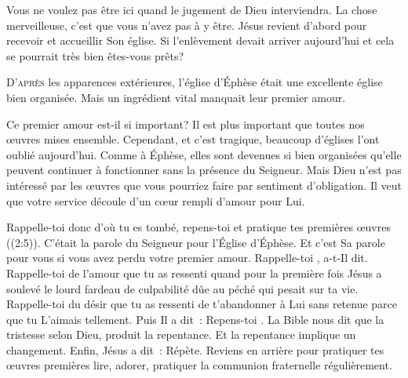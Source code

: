 Vous ne voulez pas être ici quand le jugement de Dieu interviendra.
 La chose merveilleuse, c'est que vous n'avez pas à y être.
 Jésus revient d'abord pour recevoir et accueillir Son église. 
 Si l'enlèvement devait arriver aujourd'hui
 \ocadr et cela se pourrait très bien \fcadr{} êtes-vous prêts? 

\dvrule






\lettrine{D}{'après} les apparences extérieures,
 l'église d'Éphèse était une excellente église bien organisée.
 Mais un ingrédient vital manquait \ocadr leur premier amour. 

Ce premier amour est-il si important?
 Il est plus important que toutes nos œuvres mises ensemble.
 Cependant, et c'est tragique,
 beaucoup d'églises l'ont oublié aujourd'hui.
 Comme à Éphèse, elles sont devenues si bien organisées
 qu'elle peuvent continuer à fonctionner sans la présence du Seigneur.
 Mais Dieu n'est pas intéressé par les œuvres que vous pourriez faire
 par sentiment d'obligation. Il veut que votre service découle
 d'un cœur rempli d'amour pour Lui. 


\og Rappelle-toi donc d'où tu es tombé, repens-toi
 et pratique tes premières œuvres \fg{} ((2:5)).
 C'était la parole du Seigneur pour l'Église d'Éphèse.
 Et c'est Sa parole pour vous si vous avez perdu votre premier amour.
 \og Rappelle-toi \fg{},  a-t-Il dit.
 Rappelle-toi de l'amour que tu as ressenti quand pour la première fois
 Jésus a soulevé le lourd fardeau de culpabilité dûe au péché
 qui pesait sur ta vie. Rappelle-toi du désir que tu as ressenti
 de t'abandonner à Lui sans retenue parce que tu L'aimais tellement.
 Puis Il a dit~:  \og Repens-toi \fg{}.
 La Bible nous dit que la tristesse selon Dieu, produit la repentance.
 Et la repentance implique un changement. Enfin, Jésus a dit~: 
 \og Répète. \fg{} Reviens en arrière pour pratiquer tes œuvres premières
 \ocadr lire, adorer, pratiquer la communion fraternelle régulièrement. 

